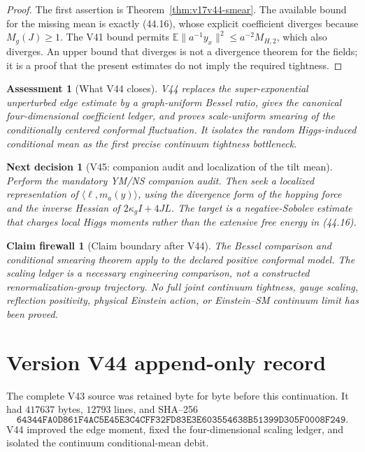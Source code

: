 \documentclass[11pt]{article}
\newtheorem{firewall}[theorem]{Claim firewall}
\newtheorem{decision}[theorem]{Next decision}
\newtheorem{assessment}[theorem]{Assessment}
\theoremstyle{remark}
\begin{document}
\begin{proof}
The first assertion is Theorem~\ref{thm:v17v44-smear}.  The available
bound for the missing mean is exactly (44.16), whose explicit
coefficient diverges because \(M_g(J)\geq1\).  The V41 bound permits
\(\mathbb E\|a^{-1}y_x\|^2\leq a^{-2}M_{H,2}\), which also diverges.
An upper bound that diverges is not a divergence theorem for the
fields; it is a proof that the present estimates do not imply the
required tightness.
\end{proof}

\begin{assessment}[What V44 closes]
\label{ass:v17v44-status}
V44 replaces the super-exponential unperturbed edge estimate by a
graph-uniform Bessel ratio, gives the canonical four-dimensional
coefficient ledger, and proves scale-uniform smearing of the
conditionally centered conformal fluctuation.  It isolates the random
Higgs-induced conditional mean as the first precise continuum
tightness bottleneck.
\end{assessment}

\begin{decision}[V45: companion audit and localization of the tilt mean]
\label{dec:v17v44-next}
Perform the mandatory YM/NS companion audit.  Then seek a localized
representation of
\(\langle\ell,m_a(y)\rangle\), using the divergence form of the hopping
force and the inverse Hessian of
\(2\kappa_gI+4JL\).  The target is a negative-Sobolev estimate that
charges local Higgs moments rather than the extensive free energy in
(44.16).
\end{decision}

\begin{firewall}[Claim boundary after V44]
\label{fire:v17v44}
The Bessel comparison and conditional smearing theorem apply to the
declared positive conformal model.  The scaling ledger is a necessary
engineering comparison, not a constructed renormalization-group
trajectory.  No full joint continuum tightness, gauge scaling,
reflection positivity, physical Einstein action, or Einstein--SM
continuum limit has been proved.
\end{firewall}

\section*{Version V44 append-only record}
The complete V43 source was retained byte for byte before this
continuation.  It had \(417637\) bytes, \(12793\) lines, and SHA--256
\[
 \texttt{64344FA0D861F4AC5E45E3C4CFF32FD83E3E603554638B51399D305F0008F249}.
\]
V44 improved the edge moment, fixed the four-dimensional scaling
ledger, and isolated the continuum conditional-mean debit.
\end{document}
